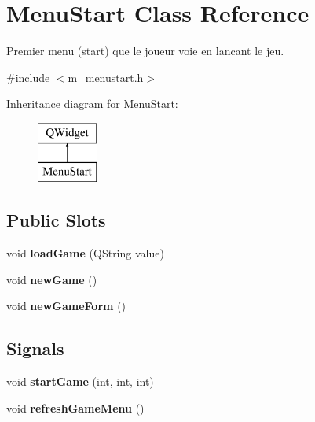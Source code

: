 \hypertarget{class_menu_start}{}\section{Menu\+Start Class Reference}
\label{class_menu_start}


Premier menu (start) que le joueur voie en lancant le jeu.  




{\ttfamily \#include $<$m\+\_\+menustart.\+h$>$}

Inheritance diagram for Menu\+Start\+:\begin{figure}[H]
\begin{center}
\leavevmode
\includegraphics[height=2.000000cm]{class_menu_start}
\end{center}
\end{figure}
\subsection*{Public Slots}
\begin{DoxyCompactItemize}
\item 
\hypertarget{class_menu_start_a8af8ec946e4b575852937b469bfe3d59}{}void {\bfseries load\+Game} (Q\+String value)\label{class_menu_start_a8af8ec946e4b575852937b469bfe3d59}

\item 
\hypertarget{class_menu_start_a3ebce084546f1f9374a2e1cd0378d17a}{}void {\bfseries new\+Game} ()\label{class_menu_start_a3ebce084546f1f9374a2e1cd0378d17a}

\item 
\hypertarget{class_menu_start_a27892e476830d761fae92cc8b7db323f}{}void {\bfseries new\+Game\+Form} ()\label{class_menu_start_a27892e476830d761fae92cc8b7db323f}

\end{DoxyCompactItemize}
\subsection*{Signals}
\begin{DoxyCompactItemize}
\item 
\hypertarget{class_menu_start_a24c4dbfed1831cca70f027372846d484}{}void {\bfseries start\+Game} (int, int, int)\label{class_menu_start_a24c4dbfed1831cca70f027372846d484}

\item 
\hypertarget{class_menu_start_a277ad4799e66f6b7e314d159467bc963}{}void {\bfseries refresh\+Game\+Menu} ()\label{class_menu_start_a277ad4799e66f6b7e314d159467bc963}

\end{DoxyCompactItemize}

